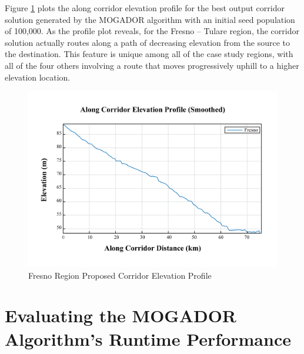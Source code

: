 Figure \ref{fig:FelevationProfile} plots the along corridor elevation profile for the best output corridor solution generated by the MOGADOR algorithm with an initial seed population of 100,000. As the profile plot reveals, for the Fresno -- Tulare region, the corridor solution actually routes along a path of decreasing elevation from the source to the destination. This feature is unique among all of the case study regions, with all of the four others involving a route that moves progressively uphill to a higher elevation location. 
        
        \begin{figure}[!h]
            \begin{center}
            \includegraphics[width=5.5in]{figures/Fresno_Elevation_Profile.png}   
            \caption{Fresno Region Proposed Corridor Elevation Profile}
            \label{fig:FelevationProfile}
            \end{center}
        \end{figure}

\clearpage
    
\section{Evaluating the MOGADOR Algorithm's Runtime Performance}

